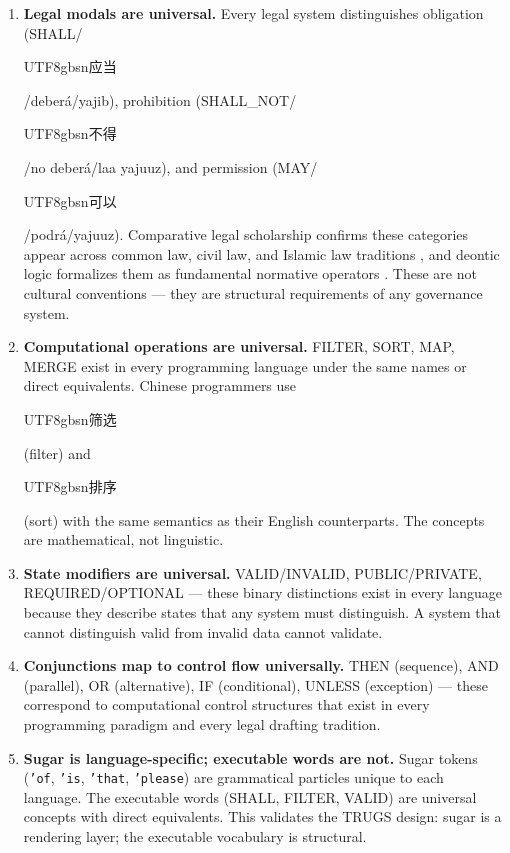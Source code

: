 \documentclass{article}
\begin{document}
\begin{enumerate}
    \item \textbf{Legal modals are universal.} Every legal system distinguishes obligation (SHALL/\begin{CJK}{UTF8}{gbsn}应当\end{CJK}/deber\'a/yajib), prohibition (SHALL\_NOT/\begin{CJK}{UTF8}{gbsn}不得\end{CJK}/no deber\'a/laa yajuuz), and permission (MAY/\begin{CJK}{UTF8}{gbsn}可以\end{CJK}/podr\'a/yajuuz). Comparative legal scholarship confirms these categories appear across common law, civil law, and Islamic law traditions \citep{nyazee2022comparison}, and deontic logic formalizes them as fundamental normative operators \citep{vonwright1951deontic}. These are not cultural conventions --- they are structural requirements of any governance system.

    \item \textbf{Computational operations are universal.} FILTER, SORT, MAP, MERGE exist in every programming language under the same names or direct equivalents. Chinese programmers use \begin{CJK}{UTF8}{gbsn}筛选\end{CJK} (filter) and \begin{CJK}{UTF8}{gbsn}排序\end{CJK} (sort) with the same semantics as their English counterparts. The concepts are mathematical, not linguistic.

    \item \textbf{State modifiers are universal.} VALID/INVALID, PUBLIC/PRIVATE, REQUIRED/OPTIONAL --- these binary distinctions exist in every language because they describe states that any system must distinguish. A system that cannot distinguish valid from invalid data cannot validate.

    \item \textbf{Conjunctions map to control flow universally.} THEN (sequence), AND (parallel), OR (alternative), IF (conditional), UNLESS (exception) --- these correspond to computational control structures that exist in every programming paradigm and every legal drafting tradition.

    \item \textbf{Sugar is language-specific; executable words are not.} Sugar tokens (\texttt{'of}, \texttt{'is}, \texttt{'that}, \texttt{'please}) are grammatical particles unique to each language. The executable words (SHALL, FILTER, VALID) are universal concepts with direct equivalents. This validates the TRUGS design: sugar is a rendering layer; the executable vocabulary is structural.
\end{enumerate}
\end{document}

